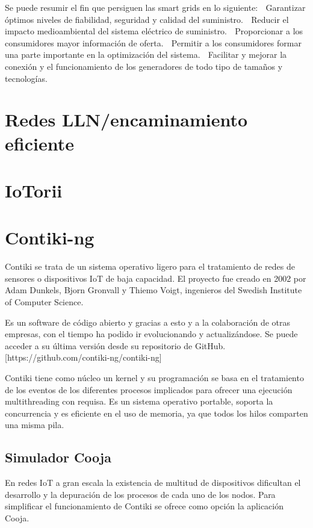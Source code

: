 Se puede resumir el fin que persiguen las smart grids en lo siguiente:
 Garantizar óptimos niveles de fiabilidad, seguridad y calidad del 
suministro.
 Reducir el impacto medioambiental del sistema eléctrico de suministro.
 Proporcionar a los consumidores mayor información de oferta.
 Permitir a los consumidores formar una parte importante en la 
optimización del sistema.
 Facilitar y mejorar la conexión y el funcionamiento de los generadores de 
todo tipo de tamaños y tecnologías.


\section{Redes LLN/encaminamiento eficiente}







\section{IoTorii}



\section{Contiki-ng}
Contiki se trata de un sistema operativo ligero para el tratamiento de redes de sensores o dispositivos IoT de baja capacidad. El proyecto fue creado en 2002 por Adam Dunkels, Bjorn Gronvall y Thiemo Voigt, ingenieros del Swedish Institute of Computer Science. 

Es un software de código abierto y gracias a esto y a la colaboración de otras empresas, con el tiempo ha podido ir evolucionando y actualizándose. Se puede acceder a su última versión desde su repositorio de GitHub. [https://github.com/contiki-ng/contiki-ng]

Contiki tiene como núcleo un kernel y su programación se basa en el tratamiento de los eventos de los diferentes procesos implicados para ofrecer una ejecución multithreading con requisa. Es un sistema operativo portable, soporta la concurrencia y es eficiente en el uso de memoria, ya que todos los hilos comparten una misma pila.


\subsection{Simulador Cooja}
En redes IoT a gran escala la existencia de multitud de dispositivos dificultan el desarrollo y la depuración de los procesos de cada uno de los nodos. Para simplificar el funcionamiento de Contiki se ofrece como opción la aplicación Cooja.

